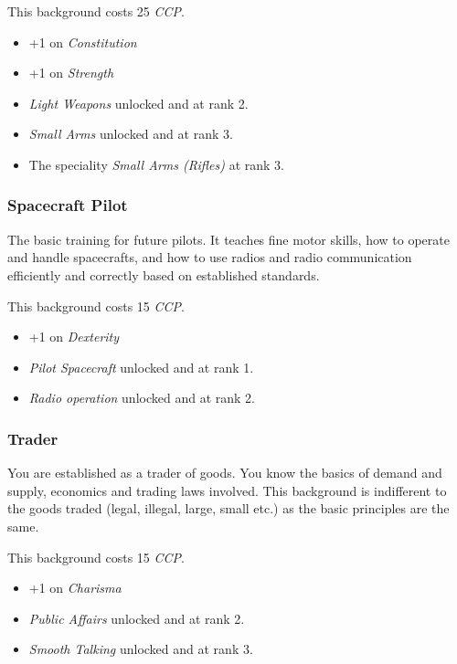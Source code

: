 This background costs 25 \emph{CCP}.

\begin{itemize}
\item +1 on \emph{Constitution}
\item +1 on \emph{Strength}
\item \emph{Light Weapons} unlocked and at rank 2.
\item \emph{Small Arms} unlocked and at rank 3.
\item The speciality \emph{Small Arms (Rifles)} at rank 3.
\end{itemize}

\subsubsection{Spacecraft Pilot}

The basic training for future pilots. It teaches fine motor skills, how to
operate and handle spacecrafts, and how to use radios and radio communication
efficiently and correctly based on established standards.

This background costs 15 \emph{CCP}.

\begin{itemize}
\item +1 on \emph{Dexterity}
\item \emph{Pilot Spacecraft} unlocked and at rank 1.
\item \emph{Radio operation} unlocked and at rank 2.
\end{itemize}

\subsubsection{Trader}

You are established as a trader of goods. You know the basics of demand and
supply, economics and trading laws involved. This background is indifferent
to the goods traded (legal, illegal, large, small etc.) as the basic principles
are the same.

This background costs 15 \emph{CCP}.

\begin{itemize}
\item +1 on \emph{Charisma}
\item \emph{Public Affairs} unlocked and at rank 2.
\item \emph{Smooth Talking} unlocked and at rank 3.
\end{itemize}
